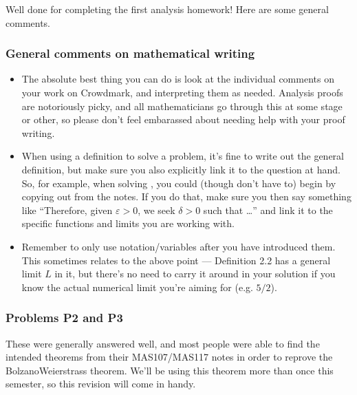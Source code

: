 \documentclass[letterpaper,10pt,english]{jupyterBook}
\begin{document}
\sphinxAtStartPar
Well done for completing the first analysis homework! Here are some general comments.


\subsubsection{General comments on mathematical writing}
\label{\detokenize{HW-feedback:general-comments-on-mathematical-writing}}\begin{itemize}
\item {} 
\sphinxAtStartPar
The absolute best thing you can do is look at the individual comments on your work on Crowdmark, and  interpreting them as needed. Analysis proofs are notoriously picky, and all mathematicians go through this at some stage or other, so please don’t feel embarassed about needing help with your proof writing.

\item {} 
\sphinxAtStartPar
When using a definition to solve a problem, it’s fine to write out the general definition, but make sure you also explicitly link it to the question at hand. So, for example, when solving {\hyperref[\detokenize{Problems:id3}]{}}, you could (though don’t have to) begin by copying out  from the notes. If you do that, make sure you then say something like “Therefore, given \(\varepsilon>0\), we seek \(\delta>0\) such that …” and link it to the specific functions and limits you are working with.

\item {} 
\sphinxAtStartPar
Remember to only use notation/variables after you have introduced them. This sometimes relates to the above point — Definition 2.2 has a general limit \(L\) in it, but there’s no need to carry it around in your solution if you know the actual numerical limit you’re aiming for (e.g. \(5/2\)).

\end{itemize}


\subsubsection{Problems P2 and P3}
\label{\detokenize{HW-feedback:problems-p2-and-p3}}
\sphinxAtStartPar
These were generally answered well, and most people were able to find the intended theorems from their MAS107/MAS117 notes in order to re\sphinxhyphen{}prove the Bolzano\sphinxhyphen{}Weierstrass theorem. We’ll be using this theorem more than once this semester, so this revision will come in handy.
\end{document}
